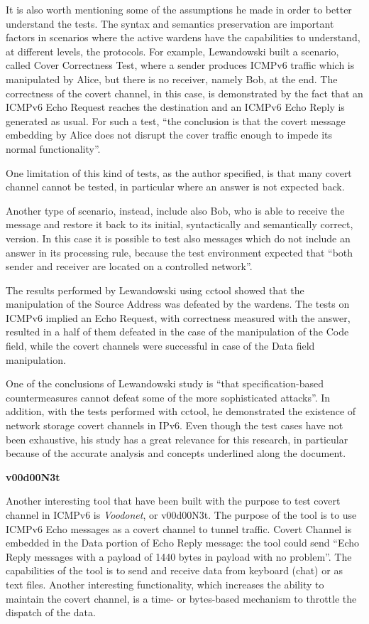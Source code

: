 \documentclass[12pt]{article}
\begin{document}
It is also worth mentioning some of the assumptions he made in order to better understand the tests. The syntax and semantics preservation are important factors in scenarios where the active wardens have the capabilities to understand, at different levels, the protocols. For example, Lewandowski built a scenario, called Cover Correctness Test, where a sender produces ICMPv6 traffic which is manipulated by Alice, but there is no receiver, namely Bob, at the end. The correctness of the covert channel, in this case, is demonstrated by the fact that an ICMPv6 Echo Request reaches the destination and an ICMPv6 Echo Reply is generated as usual. For such a test, ``the conclusion is that the covert message embedding by Alice does not disrupt the cover traffic enough to impede its normal functionality''\cite{lewandowski}.

One limitation of this kind of tests, as the author specified, is that many covert channel cannot be tested, in particular where an answer is not expected back.

Another type of scenario, instead, include also Bob, who is able to receive the message and restore it back to its initial, syntactically and semantically correct, version. In this case it is possible to test also messages which do not include an answer in its processing rule, because the test environment expected that ``both sender and receiver are located on a controlled network''\cite{lewandowski}.

The results performed by Lewandowski using cctool showed that the manipulation of the Source Address was defeated by the wardens. The tests on ICMPv6 implied an Echo Request, with correctness measured with the answer, resulted in a half of them defeated in the case of the manipulation of the Code field, while the covert channels were successful in case of the Data field manipulation.

One of the conclusions of Lewandowski study is ``that specification-based countermeasures cannot defeat some of the more sophisticated attacks''. In addition, with the tests performed with cctool, he demonstrated the existence of network storage covert channels in IPv6. Even though the test cases have not been exhaustive, his study has a great relevance for this research, in particular because of the accurate analysis and concepts underlined along the document\cite{lewandowski}.

\textbf{v00d00N3t}

Another interesting tool that have been built with the purpose to test covert channel in ICMPv6 is \textit{Voodonet}, or v00d00N3t. The purpose of the tool is to use ICMPv6 Echo messages as a covert channel to tunnel traffic. Covert Channel is embedded in the Data portion of Echo Reply message: the tool could send ``Echo Reply messages with a  payload of 1440 bytes in payload with no problem''. The capabilities of the tool is to send and receive data from keyboard (chat) or as text files. Another interesting functionality, which increases the ability to maintain the covert channel, is a time- or bytes-based mechanism to throttle the dispatch of the data\cite{voodoo}.
\end{document}

